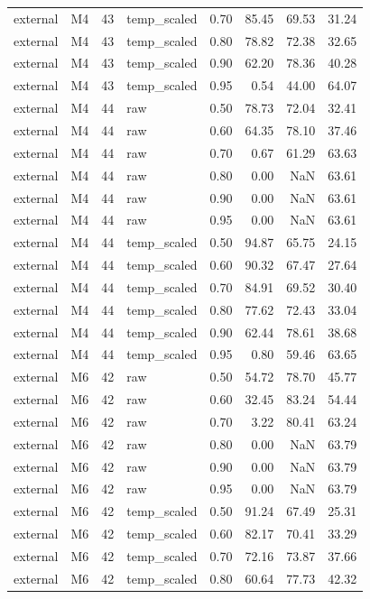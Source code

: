 \begin{tabular}{llrlrrrr}
external & M4 & 43 & temp\_scaled & 0.70 & 85.45 & 69.53 & 31.24 \\
external & M4 & 43 & temp\_scaled & 0.80 & 78.82 & 72.38 & 32.65 \\
external & M4 & 43 & temp\_scaled & 0.90 & 62.20 & 78.36 & 40.28 \\
external & M4 & 43 & temp\_scaled & 0.95 & 0.54 & 44.00 & 64.07 \\
external & M4 & 44 & raw & 0.50 & 78.73 & 72.04 & 32.41 \\
external & M4 & 44 & raw & 0.60 & 64.35 & 78.10 & 37.46 \\
external & M4 & 44 & raw & 0.70 & 0.67 & 61.29 & 63.63 \\
external & M4 & 44 & raw & 0.80 & 0.00 & NaN & 63.61 \\
external & M4 & 44 & raw & 0.90 & 0.00 & NaN & 63.61 \\
external & M4 & 44 & raw & 0.95 & 0.00 & NaN & 63.61 \\
external & M4 & 44 & temp\_scaled & 0.50 & 94.87 & 65.75 & 24.15 \\
external & M4 & 44 & temp\_scaled & 0.60 & 90.32 & 67.47 & 27.64 \\
external & M4 & 44 & temp\_scaled & 0.70 & 84.91 & 69.52 & 30.40 \\
external & M4 & 44 & temp\_scaled & 0.80 & 77.62 & 72.43 & 33.04 \\
external & M4 & 44 & temp\_scaled & 0.90 & 62.44 & 78.61 & 38.68 \\
external & M4 & 44 & temp\_scaled & 0.95 & 0.80 & 59.46 & 63.65 \\
external & M6 & 42 & raw & 0.50 & 54.72 & 78.70 & 45.77 \\
external & M6 & 42 & raw & 0.60 & 32.45 & 83.24 & 54.44 \\
external & M6 & 42 & raw & 0.70 & 3.22 & 80.41 & 63.24 \\
external & M6 & 42 & raw & 0.80 & 0.00 & NaN & 63.79 \\
external & M6 & 42 & raw & 0.90 & 0.00 & NaN & 63.79 \\
external & M6 & 42 & raw & 0.95 & 0.00 & NaN & 63.79 \\
external & M6 & 42 & temp\_scaled & 0.50 & 91.24 & 67.49 & 25.31 \\
external & M6 & 42 & temp\_scaled & 0.60 & 82.17 & 70.41 & 33.29 \\
external & M6 & 42 & temp\_scaled & 0.70 & 72.16 & 73.87 & 37.66 \\
external & M6 & 42 & temp\_scaled & 0.80 & 60.64 & 77.73 & 42.32 \\

\end{tabular}
